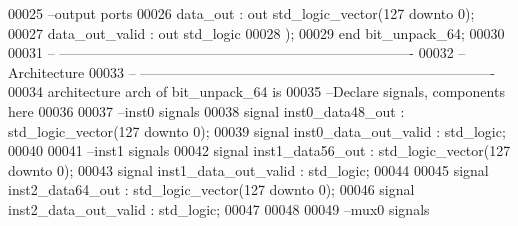 \begin{DoxyCode}
00025 \textcolor{keyword}{        --output ports }
00026         \textcolor{vhdlchar}{data_out}        \textcolor{vhdlchar}{:} \textcolor{keywordflow}{out} \textcolor{comment}{std\_logic\_vector}\textcolor{vhdlchar}{(}\textcolor{vhdllogic}{}\textcolor{vhdllogic}{127} \textcolor{keywordflow}{downto} \textcolor{vhdllogic}{}\textcolor{vhdllogic}{0}\textcolor{vhdlchar}{)};
00027         \textcolor{vhdlchar}{data_out_valid}  \textcolor{vhdlchar}{:} \textcolor{keywordflow}{out} \textcolor{comment}{std\_logic}       
00028         \textcolor{vhdlchar}{)};
00029 \textcolor{keywordflow}{end} \textcolor{vhdlchar}{bit\_unpack\_64};
00030 
00031 \textcolor{keyword}{-- ----------------------------------------------------------------------------}
00032 \textcolor{keyword}{-- Architecture}
00033 \textcolor{keyword}{-- ----------------------------------------------------------------------------}
00034 \textcolor{keywordflow}{architecture} arch \textcolor{keywordflow}{of} bit_unpack_64 is
00035 \textcolor{keyword}{--Declare signals,  components here}
00036 
00037 \textcolor{keyword}{--inst0 signals}
00038 \textcolor{keywordflow}{signal} \textcolor{vhdlchar}{inst0_data48_out}         \textcolor{vhdlchar}{:} \textcolor{comment}{std\_logic\_vector}\textcolor{vhdlchar}{(}\textcolor{vhdllogic}{}\textcolor{vhdllogic}{127} \textcolor{keywordflow}{downto} \textcolor{vhdllogic}{}\textcolor{vhdllogic}{0}\textcolor{vhdlchar}{)};
00039 \textcolor{keywordflow}{signal} \textcolor{vhdlchar}{inst0_data_out_valid} \textcolor{vhdlchar}{:} \textcolor{comment}{std\_logic};
00040 
00041 \textcolor{keyword}{--inst1 signals}
00042 \textcolor{keywordflow}{signal} \textcolor{vhdlchar}{inst1_data56_out}         \textcolor{vhdlchar}{:} \textcolor{comment}{std\_logic\_vector}\textcolor{vhdlchar}{(}\textcolor{vhdllogic}{}\textcolor{vhdllogic}{127} \textcolor{keywordflow}{downto} \textcolor{vhdllogic}{}\textcolor{vhdllogic}{0}\textcolor{vhdlchar}{)};
00043 \textcolor{keywordflow}{signal} \textcolor{vhdlchar}{inst1_data_out_valid} \textcolor{vhdlchar}{:} \textcolor{comment}{std\_logic};
00044 
00045 \textcolor{keywordflow}{signal} \textcolor{vhdlchar}{inst2_data64_out}       \textcolor{vhdlchar}{:} \textcolor{comment}{std\_logic\_vector}\textcolor{vhdlchar}{(}\textcolor{vhdllogic}{}\textcolor{vhdllogic}{127} \textcolor{keywordflow}{downto} \textcolor{vhdllogic}{}\textcolor{vhdllogic}{0}\textcolor{vhdlchar}{)};
00046 \textcolor{keywordflow}{signal} \textcolor{vhdlchar}{inst2_data_out_valid}   \textcolor{vhdlchar}{:} \textcolor{comment}{std\_logic};
00047 
00048 
00049 \textcolor{keyword}{--mux0 signals}

\end{DoxyCode}
